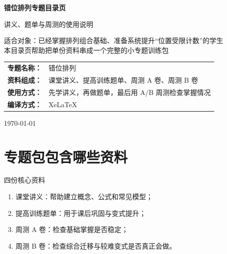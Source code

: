 \documentclass[11pt,a4paper,fontset=fandol]{ctexart}
\begin{document}
\thispagestyle{empty}
\begin{titlepage}
\centering
\vspace*{0.9cm}

\begin{tcolorbox}[
  enhanced,
  width=0.92\textwidth,
  colback=white,
  colframe=mainblue,
  boxrule=1pt,
  arc=0mm,
  left=6mm,
  right=6mm,
  top=8mm,
  bottom=8mm
]
\centering

{\fontsize{24}{30}\selectfont\bfseries 错位排列专题目录页\par}
\vspace{0.65cm}
{\fontsize{17}{22}\selectfont 讲义、题单与周测的使用说明\par}

\vspace{1cm}
\begin{tcolorbox}[colback=lightblue,colframe=mainblue,width=0.84\textwidth,boxrule=1pt]
\centering
{\large 适合对象：已经掌握排列组合基础、准备系统提升“位置受限计数”的学生}\\[0.35em]
{\normalsize 本目录页帮助把单份资料串成一个完整的小专题训练包}
\end{tcolorbox}

\vspace{1.0cm}
\renewcommand{\arraystretch}{1.42}
\begin{tabular}{>{\bfseries}p{3.5cm}p{8cm}}
专题名称： & 错位排列 \\
资料组成： & 课堂讲义、提高训练题单、周测 A 卷、周测 B 卷 \\
使用方式： & 先学讲义，再做题单，最后用 A/B 周测检查掌握情况 \\
编译方式： & XeLaTeX \\
\end{tabular}

\vspace{0.9cm}
{\large \today\par}
\end{tcolorbox}
\end{titlepage}

\tableofcontents
\newpage

\section{专题包包含哪些资料}

\begin{goalbox}{四份核心资料}
\begin{enumerate}
  \item 课堂讲义：帮助建立概念、公式和常见模型；
  \item 提高训练题单：用于课后巩固与变式提升；
  \item 周测 A 卷：检查基础掌握是否稳定；
  \item 周测 B 卷：检查综合迁移与较难变式是否真正会做。
\end{enumerate}
\end{goalbox}
\end{document}
